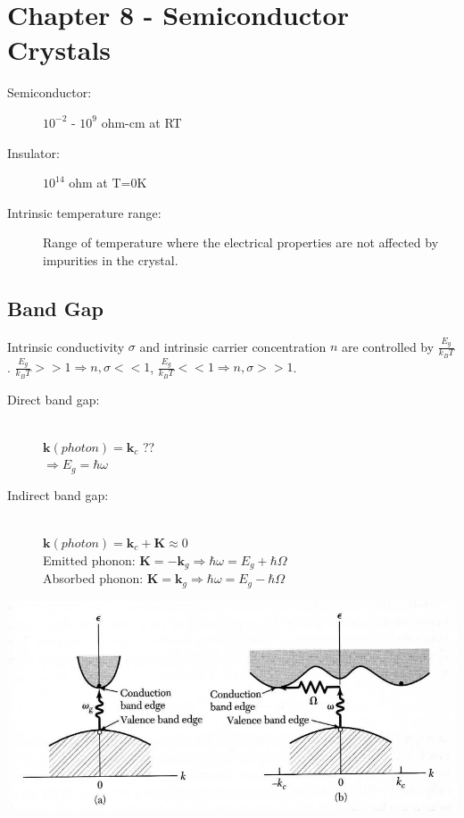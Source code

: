 \section{Chapter 8 - Semiconductor Crystals} 

		\begin{description}
			\item[Semiconductor:] $10^{-2}$ - $10^{9}$ ohm-cm at RT
			\item[Insulator:] $10^{14}$ ohm at T=0K
			\item[Intrinsic temperature range:]  Range of temperature where the electrical properties are not affected by impurities in the crystal.
		\end{description}
		
		\subsection{Band Gap}
			Intrinsic conductivity $\sigma$ and intrinsic carrier concentration $n$ are controlled by $\frac{E_g}{k_BT}$.  $\frac{E_g}{k_BT}>>1\Rightarrow n , \sigma << 1$, $\frac{E_g}{k_BT}<<1\Rightarrow n , \sigma >> 1$.
			
			\begin{description}
				\item[Direct band gap:] ~\\
									$\textbf{k}(photon) = \textbf{k}_c $ ??\\
										$\Rightarrow E_g = \hbar \omega$
				\item[Indirect band gap:]  ~\\
										 $\textbf{k}(photon) = \textbf{k}_c + \textbf{K}\approx  0$ \\
										Emitted phonon: $\textbf{K}=-\textbf{k}_g \Rightarrow \hbar \omega = E_g  + \hbar \Omega$ \\
										Absorbed phonon: $\textbf{K}=\textbf{k}_g \Rightarrow \hbar \omega = E_g  - \hbar \Omega$ \\
			\end{description}
			\includegraphics[scale=0.6]{direct_indirect.png}
			~\\
			
